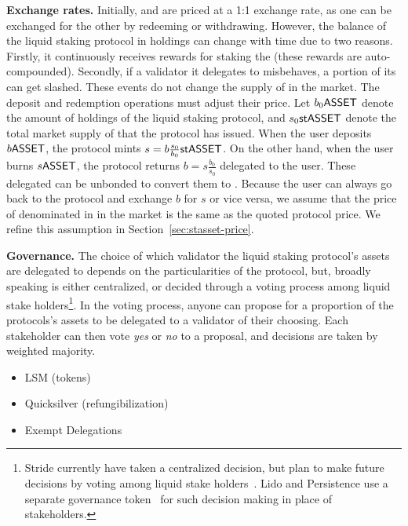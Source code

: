 \noindent
\textbf{Exchange rates.} Initially, \asset and \stasset are priced at a 1:1 exchange rate,
as one can be exchanged for the other by redeeming or withdrawing. However, the balance
of the liquid staking protocol in \asset holdings can change with time due to two reasons.
Firstly, it continuously receives rewards for staking the \asset (these rewards are
auto-compounded). Secondly, if a validator it delegates to misbehaves, a portion of its
\asset can get slashed. These events do not change the supply of \stasset in the market.
The deposit and redemption operations must adjust their price.
Let $b_0 \text{\textsf{ASSET}}$ denote the amount of \asset holdings of the liquid staking
protocol, and $s_0 \text{\textsf{stASSET}}$ denote the total market supply of \stasset that the protocol
has issued. When the user deposits $b \text{\textsf{ASSET}}$, the protocol mints $s = b \frac{s_0}{b_0} \text{\textsf{stASSET}}$.
On the other hand, when the user burns $s \text{\textsf{ASSET}}$, the protocol returns $b = s \frac{b_0}{s_0}$
delegated \asset to the user. These delegated \asset can be unbonded to convert them
to \asset. Because the user can always go back to the protocol and exchange $b$ for $s$ or
vice versa, we assume that the price of \stasset denominated in \asset in the
market is the same as the quoted protocol price. We refine this assumption in
Section~\ref{sec:stasset-price}.

\noindent
\textbf{Governance.}
The choice of which validator the liquid staking protocol's assets are delegated to
depends on the particularities of the protocol, but, broadly speaking
is either centralized, or decided through a voting process among
liquid stake holders\footnote{Stride currently have
taken a centralized decision, but plan to make future decisions by voting
among liquid stake holders~\cite{stride-validators}. Lido and Persistence
use a separate governance token~\cite{lido-validators,persistence-validators} for
such decision making in place of stakeholders.}.
In the voting process, anyone can propose for a proportion of the protocols's assets
to be delegated to a validator of their choosing.
Each stakeholder can then vote \emph{yes} or \emph{no}
to a proposal, and decisions are taken by weighted majority.

\begin{itemize}
  \item LSM (tokens)
  \item Quicksilver (refungibilization)
  \item Exempt Delegations
\end{itemize}
